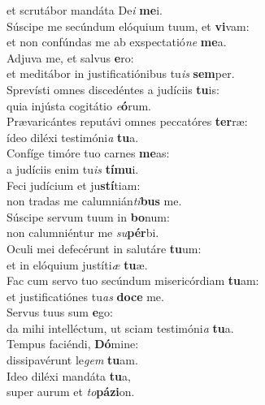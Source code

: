 \oddverse et scrutábor mandáta De\textit{i} \textbf{me}i.\\
\evenverse Súscipe me secúndum elóquium tuum, et \textbf{vi}vam:~\*\\
\evenverse et non confúndas me ab exspectatió\textit{ne} \textbf{me}a.\\
\oddverse Adjuva me, et salvus \textbf{e}ro:~\*\\
\oddverse et meditábor in justificatiónibus tu\textit{is} \textbf{sem}per.\\
\evenverse Sprevísti omnes discedéntes a judíciis \textbf{tu}is:~\*\\
\evenverse quia injústa cogitátio \textit{e}\textbf{ó}rum.\\
\oddverse Prævaricántes reputávi omnes peccatóres \textbf{ter}ræ:~\*\\
\oddverse ídeo diléxi testimóni\textit{a} \textbf{tu}a.\\
\evenverse Confíge timóre tuo carnes \textbf{me}as:~\*\\
\evenverse a judíciis enim tu\textit{is} \textbf{tí}\textbf{mu}i.\\
\oddverse Feci judícium et ju\textbf{stí}tiam:~\*\\
\oddverse non tradas me calumnián\textit{ti}\textbf{bus} me.\\
\evenverse Súscipe servum tuum in \textbf{bo}num:~\*\\
\evenverse non calumniéntur me \textit{su}\textbf{pér}bi.\\
\oddverse Oculi mei defecérunt in salutáre \textbf{tu}um:~\*\\
\oddverse et in elóquium justíti\textit{æ} \textbf{tu}æ.\\
\evenverse Fac cum servo tuo secúndum misericórdiam \textbf{tu}am:~\*\\
\evenverse et justificatiónes tu\textit{as} \textbf{do}\textbf{ce} me.\\
\oddverse Servus tuus sum \textbf{e}go:~\*\\
\oddverse da mihi intelléctum, ut sciam testimóni\textit{a} \textbf{tu}a.\\
\evenverse Tempus faciéndi, \textbf{Dó}mine:~\*\\
\evenverse dissipavérunt le\textit{gem} \textbf{tu}am.\\
\oddverse Ideo diléxi mandáta \textbf{tu}a,~\*\\
\oddverse super aurum et \textit{to}\textbf{pá}\textbf{zi}on.\\
